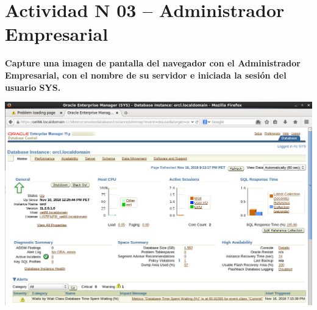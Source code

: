 \section{Actividad N 03 – Administrador Empresarial} 
\textbf{Capture una imagen de pantalla del navegador con el Administrador Empresarial, con el nombre de su servidor e iniciada la sesión del usuario SYS.}
\vspace{5mm}
\begin{center}
  \includegraphics[width=\columnwidth]{images/admi-empresarial}\\
\end{center}